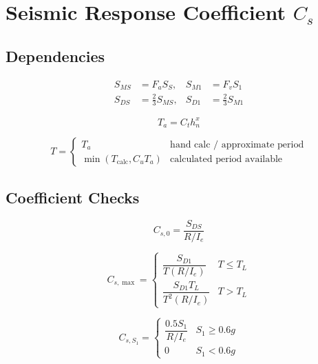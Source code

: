 \documentclass[10pt]{article}
\begin{document}
\section{Seismic Response Coefficient $C_s$}

\subsection{Dependencies}

\begin{equation}
\begin{aligned}
S_{MS} &= F_aS_S, &
S_{M1} &= F_vS_1 \\
S_{DS} &= \frac{2}{3}S_{MS}, &
S_{D1} &= \frac{2}{3}S_{M1}
\end{aligned}
\end{equation}

\begin{equation}
T_a = C_th_n^x
\end{equation}

\begin{equation}
T =
\begin{cases}
T_a & \text{hand calc / approximate period} \\
\min(T_{\text{calc}}, C_uT_a) & \text{calculated period available}
\end{cases}
\end{equation}

\subsection{Coefficient Checks}

\begin{equation}
C_{s,0} = \frac{S_{DS}}{R/I_e}
\end{equation}

\begin{equation}
C_{s,\max} =
\begin{cases}
\dfrac{S_{D1}}{T(R/I_e)} & T \leq T_L \\[6pt]
\dfrac{S_{D1}T_L}{T^2(R/I_e)} & T > T_L
\end{cases}
\end{equation}

\begin{equation}
C_{s,S_1} =
\begin{cases}
\dfrac{0.5S_1}{R/I_e} & S_1 \geq 0.6g \\[6pt]
0 & S_1 < 0.6g
\end{cases}
\end{equation}
\end{document}
